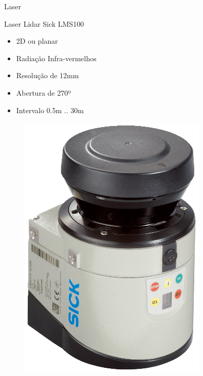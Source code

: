 \begin{frame}{Laser}

    \begin{minipage}{0.6\textwidth}
        
        Laser Lidar Sick LMS100

        \begin{itemize}
            \item 2D ou planar
            \item Radiação Infra-vermelhos
            \item Resolução de 12mm
            \item Abertura de 270º
            \item Intervalo 0.5m .. 30m
        \end{itemize}

    \end{minipage}%
    \begin{minipage}{0.4\textwidth}
        \begin{figure}
            \centering
            \includegraphics[width=0.8\textwidth]{img/laser.png}
        \end{figure}
    \end{minipage}
    
\end{frame}

